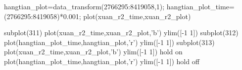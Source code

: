 hangtian_plot=data_transform(2766295:8419058,1);
hangtian_plot_time=(2766295:8419058)*0.001;
plot(xuan_r2_time,xuan_r2_plot)





subplot(311)
plot(xuan_r2_time,xuan_r2_plot,'b')
ylim([-1 1])
subplot(312)
plot(hangtian_plot_time,hangtian_plot,'r')
ylim([-1 1])
subplot(313)
plot(xuan_r2_time,xuan_r2_plot,'b')
ylim([-1 1])
hold on
plot(hangtian_plot_time,hangtian_plot,'r')
ylim([-1 1])
hold off